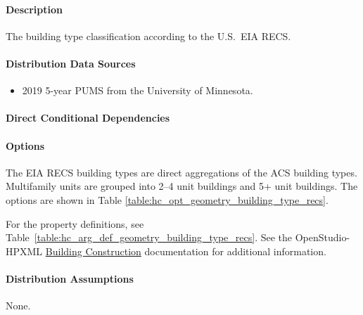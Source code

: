 \paragraph{Description}
% 
The building type classification according to the U.S.~EIA RECS.

\paragraph{Distribution Data Sources}
% 
\begin{itemize}
    \item 2019 5-year PUMS from the University of Minnesota.
\end{itemize}

\paragraph{Direct Conditional Dependencies}


\paragraph{Options}
The EIA RECS building types are direct aggregations of the ACS building types. Multifamily units are grouped into 2--4 unit buildings and 5+ unit buildings. The options are shown in Table \ref{table:hc_opt_geometry_building_type_recs}.



For the property definitions, see Table~\ref{table:hc_arg_def_geometry_building_type_recs}. See the OpenStudio-HPXML \href{https://openstudio-hpxml.readthedocs.io/en/v1.10.0/workflow_inputs.html#hpxml-building-construction}{Building Construction} documentation for additional information.



\paragraph{Distribution Assumptions}
% 
None.
